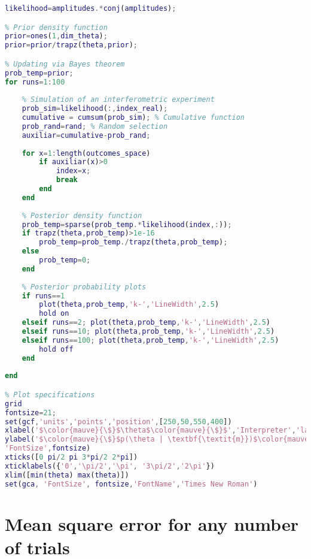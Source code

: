 \begin{lstlisting}[language=Matlab, mathescape=true]
% Likelihood function (using the Born rule)
likelihood=amplitudes.*conj(amplitudes);

% Prior density function
prior=ones(1,dim_theta);
prior=prior/trapz(theta,prior);

% Updating via Bayes theorem
prob_temp=prior;
for runs=1:100
    
    % Simulation of an interferometric experiment
    prob_sim=likelihood(:,index_real);
    cumulative = cumsum(prob_sim); % Cumulative function
    prob_rand=rand; % Random selection
    auxiliar=cumulative-prob_rand;
    
    for x=1:length(outcomes_space)
        if auxiliar(x)>0
            index=x;
            break
        end
    end
    
    % Posterior density function
    prob_temp=sparse(prob_temp.*likelihood(index,:));
    if trapz(theta,prob_temp)>1e-16
        prob_temp=prob_temp./trapz(theta,prob_temp);
    else
        prob_temp=0;
    end
    
    % Posterior probability plots
    if runs==1
        plot(theta,prob_temp,'k-','LineWidth',2.5)
        hold on
    elseif runs==2; plot(theta,prob_temp,'k-','LineWidth',2.5)
    elseif runs==10; plot(theta,prob_temp,'k-','LineWidth',2.5)
    elseif runs==100; plot(theta,prob_temp,'k-','LineWidth',2.5)
        hold off
    end
    
end

% Plot specifications
grid
fontsize=21;
set(gcf,'units','points','position',[250,50,550,400])
xlabel('$\color{mauve}{\$}$\theta$\color{mauve}{\$}$','Interpreter','latex','FontSize',fontsize)
ylabel('$\color{mauve}{\$}$p(\theta | \textbf{\textit{m}})$\color{mauve}{\$}$','Interpreter','latex',$\hspace{0.15em}\swarrow$
'FontSize',fontsize)
xticks([0 pi/2 pi 3*pi/2 2*pi])
xticklabels({'0','\pi/2','\pi', '3\pi/2','2\pi'})
xlim([min(theta) max(theta)])
set(gca, 'FontSize', fontsize,'FontName','Times New Roman')
\end{lstlisting}

\section{Mean square error for any number of trials}
\label{sec:msematlab}

